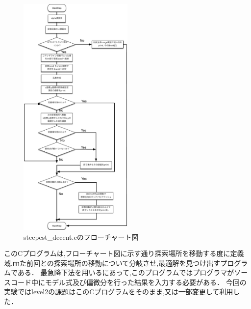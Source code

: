 \begin{figure}[H]
\centering
\includegraphics[width=0.5\textwidth]{figs/flowchart.pdf}
\caption{steepest\_decent.cのフローチャート図}
\label{fig:flowsttep}
\end{figure}

このCプログラムは,フローチャート図に示す通り探索場所を移動する度に定義域,ｍた前回との探索場所の移動について分岐させ,最適解を見つけ出すプログラムである．
最急降下法を用いるにあって,このプログラムではプログラマがソースコード中にモデル式及び偏微分を行った結果を入力する必要がある．
今回の実験ではlevel2の課題はこのCプログラムをそのまま,又は一部変更して利用した．

